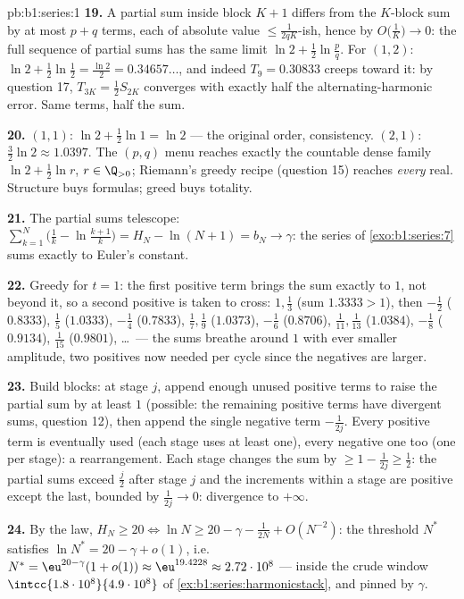 \begin{solution}{pb:b1:series:1}
\textbf{19.} A partial sum inside block $K + 1$ differs from the
$K$-block sum by at most $p + q$ terms, each of absolute value
$\leq \frac{1}{2qK}$-ish, hence by $O\bigl(\frac1K\bigr) \to 0$:
the full sequence of partial sums has the same limit $\ln 2 +
\frac12\ln\frac pq$. For $(1, 2)$: $\ln 2 + \frac12\ln\frac12 =
\frac{\ln 2}{2} = 0.34657\dots$, and indeed $T_9 = 0.30833$
creeps toward it: by question 17, $T_{3K} = \frac12 S_{2K}$
converges with exactly half the alternating-harmonic error.
Same terms, half the sum.

\textbf{20.} $(1,1)$: $\ln 2 + \frac12\ln 1 = \ln 2$ --- the
original order, consistency. $(2,1)$: $\frac32\ln 2 \approx
1.0397$. The $(p,q)$ menu reaches exactly the countable dense
family $\ln 2 + \frac12\ln r$, $r \in \Q_{>0}$; Riemann's greedy
recipe (question 15) reaches \emph{every} real. Structure buys
formulas; greed buys totality.

\textbf{21.} The partial sums telescope: $\sum_{k=1}^{N}
\bigl(\frac1k - \ln\frac{k+1}{k}\bigr) = H_N - \ln(N+1) = b_N
\to \gamma$: the series of \cref{exo:b1:series:7} sums exactly
to Euler's constant.

\textbf{22.} Greedy for $t = 1$: the first positive term brings
the sum exactly to $1$, not beyond it, so a second positive is
taken to cross: $1, \frac13$ (sum $1.3333 > 1$), then
$-\frac12$ ($0.8333$), $\frac15$ ($1.0333$), $-\frac14$
($0.7833$), $\frac17, \frac19$ ($1.0373$), $-\frac16$
($0.8706$), $\frac1{11}, \frac1{13}$ ($1.0384$), $-\frac18$
($0.9134$), $\frac1{15}$ ($0.9801$), \dots\ --- the sums breathe
around $1$ with ever smaller amplitude, two positives now
needed per cycle since the negatives are larger.

\textbf{23.} Build blocks: at stage $j$, append enough unused
positive terms to raise the partial sum by at least $1$
(possible: the remaining positive terms have divergent sums,
question 12), then append the single negative term $-\frac{1}
{2j}$. Every positive term is eventually used (each stage uses
at least one), every negative one too (one per stage): a
rearrangement. Each stage changes the sum by $\geq 1 -
\frac{1}{2j} \geq \frac12$: the partial sums exceed
$\frac{j}{2}$ after stage $j$ and the increments within a stage
are positive except the last, bounded by $\frac{1}{2j} \to 0$:
divergence to $+\infty$.

\textbf{24.} By the law, $H_N \geq 20 \iff \ln N \geq 20 -
\gamma - \frac{1}{2N} + O(N^{-2})$: the threshold $N^*$
satisfies $\ln N^* = 20 - \gamma + o(1)$, i.e.\ $N^* =
\eu^{20 - \gamma}(1 + o(1)) \approx \eu^{19.4228} \approx
2.72\cdot10^{8}$ --- inside the crude window
$\intcc{1.8\cdot10^8}{4.9\cdot10^8}$ of
\cref{ex:b1:series:harmonicstack}, and pinned by $\gamma$.


\end{solution}
